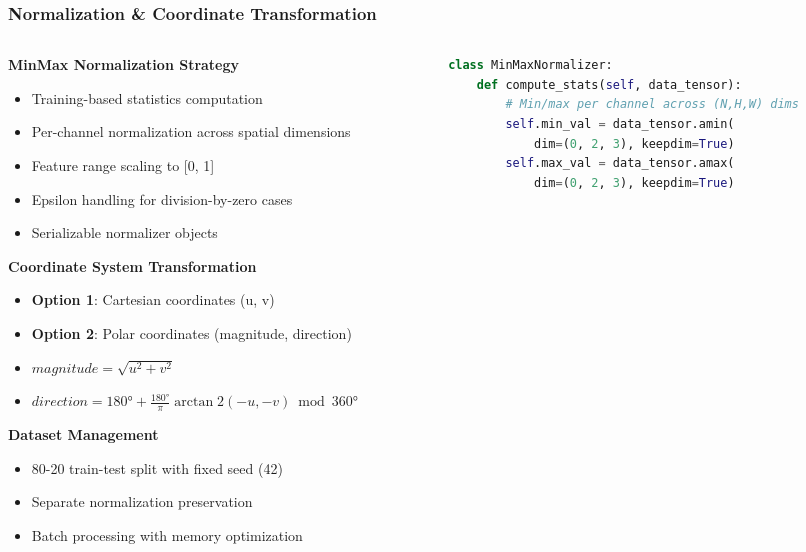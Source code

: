 \documentclass[8pt]{beamer}
\begin{document}
\begin{frame}[fragile]
\frametitle{Normalization \& Coordinate Transformation}

\begin{columns}
\begin{column}{0.5\textwidth}
\textbf{MinMax Normalization Strategy}
\begin{itemize}
    \item Training-based statistics computation
    \item Per-channel normalization across spatial dimensions
    \item Feature range scaling to [0, 1]
    \item Epsilon handling for division-by-zero cases
    \item Serializable normalizer objects
\end{itemize}

\vspace{0.3cm}

\textbf{Coordinate System Transformation}
\begin{itemize}
    \item \textbf{Option 1}: Cartesian coordinates (u, v)
    \item \textbf{Option 2}: Polar coordinates (magnitude, direction)
    \item $magnitude = \sqrt{u^2 + v^2}$
    \item $direction = 180° + \frac{180°}{\pi} \arctan2(-u, -v) \bmod 360°$
\end{itemize}

\vspace{0.3cm}

\textbf{Dataset Management}
\begin{itemize}
    \item 80-20 train-test split with fixed seed (42)
    \item Separate normalization preservation
    \item Batch processing with memory optimization
\end{itemize}
\end{column}

\begin{column}{0.5\textwidth}
\begin{lstlisting}[language=Python, basicstyle=\ttfamily\tiny]
class MinMaxNormalizer:
    def compute_stats(self, data_tensor):
        # Min/max per channel across (N,H,W) dims
        self.min_val = data_tensor.amin(
            dim=(0, 2, 3), keepdim=True)
        self.max_val = data_tensor.amax(
            dim=(0, 2, 3), keepdim=True)
        

\end{lstlisting}
\end{column}
\end{columns}
\end{frame}
\end{document}
